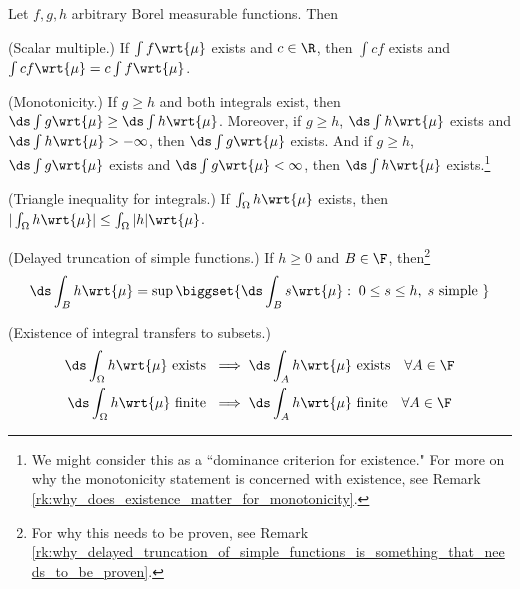 \documentclass{article} %
\newcommand{\dmu}{\wrt{\mu}}
\begin{document}
\begin{proposition}
Let $f,g,h$ arbitrary Borel measurable functions. Then
\begin{alphabate}
\item \label{item:scalar_multiple}  (Scalar multiple.) If $\int f \wrt{\mu}$ exists and $c \in \R$, then $\int cf$ exists and $\int cf \wrt{\mu} = c \int f \wrt{\mu} $. %
\item \label{item:monotonicity} (Monotonicity.)  If $g \geq h$ and both integrals exist, then $\ds\int g \wrt{\mu} \geq  \ds\int h \wrt{\mu}$. Moreover, if  $g \geq h$,  $\ds\int h \wrt{\mu}$ exists and $\ds\int h \wrt{\mu} > -\infty$, then $\ds\int g \wrt{\mu}$ exists.  And if  $g \geq h$, $\ds\int g \wrt{\mu}$ exists and $\ds\int g \wrt{\mu} < \infty$, then $\ds\int h \wrt{\mu}$ exists.\footnote{We might consider this as a ``dominance criterion for existence."  For more on why the monotonicity statement is concerned with existence, see Remark \ref{rk:why_does_existence_matter_for_monotonicity}.} 
\item \label{item:triangle_inequality_for_integrals}(Triangle inequality for integrals.) If $\int_\Omega h \dmu$ exists, then $|\int_\Omega h \dmu| \leq \int_\Omega |h| \dmu$.
\item \label{item:delayed_truncation_of_simple_functions} (Delayed truncation of simple functions.) If $h \geq 0$ and $B \in \F$, then\footnote{For why this needs to be proven, see Remark \ref{rk:why_delayed_truncation_of_simple_functions_is_something_that_needs_to_be_proven}.} 
\[ \ds\int_B h \wrt{\mu} = \sup \biggset{ \ds\int_B s \wrt{\mu} : \; 0 \leq s \leq h, \; s \text{ simple }} \]
\item \label{item:existence_transfers_to_subsets}(Existence of integral transfers to subsets.) 
\begin{align}
\ds\int_{\Omega} h \wrt{\mu} \text{ exists } &\implies 	\ds\int_{A} h \wrt{\mu} \text{ exists} \quad \forall A \in \F \\
\ds\int_{\Omega} h \wrt{\mu} \text{ finite } &\implies 	\ds\int_{A} h \wrt{\mu} \text{ finite} \quad \forall A \in \F
\end{align}

\end{alphabate}
\label{prop:properties_of_integrals_of_arbitrary_borel_measurable_functions}
\end{proposition}
\end{document}
